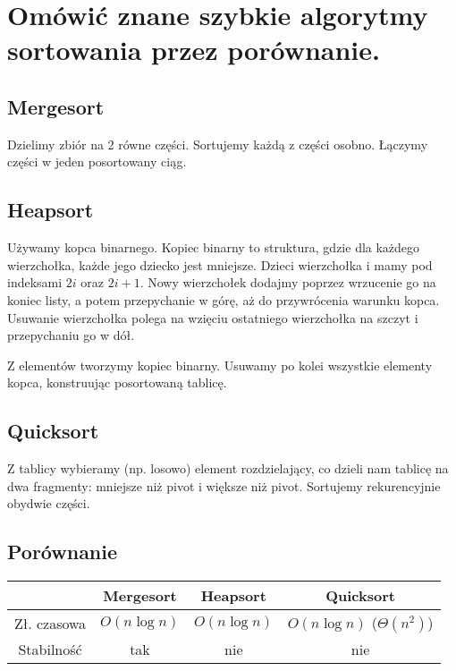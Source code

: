 \section{Omówić znane szybkie algorytmy sortowania przez porównanie.}

\subsection{Mergesort}
Dzielimy zbiór na 2 równe części.
Sortujemy każdą z części osobno.
Łączymy części w jeden posortowany ciąg.

\subsection{Heapsort}
Używamy kopca binarnego.
Kopiec binarny to struktura, gdzie dla każdego wierzchołka, każde jego dziecko jest mniejsze.
Dzieci wierzchołka i mamy pod indeksami $2i$ oraz $2i+1$.
Nowy wierzchołek dodajmy poprzez wrzucenie go na koniec listy, a potem przepychanie w górę,
aż do przywrócenia warunku kopca.
Usuwanie wierzchołka polega na wzięciu ostatniego wierzchołka na szczyt i przepychaniu go w dół.

Z elementów tworzymy kopiec binarny.
Usuwamy po kolei wszystkie elementy kopca, konstruując posortowaną tablicę.

\subsection{Quicksort}
Z tablicy wybieramy (np. losowo) element rozdzielający, co dzieli nam tablicę na dwa fragmenty:
mniejsze niż pivot i większe niż pivot.
Sortujemy rekurencyjnie obydwie części.

\subsection{Porównanie}
\begin{tabular}{|c|c|c|c|}
    \hline
    & Mergesort    & Heapsort     & Quicksort                     \\
    \hline
    Zł. czasowa & $O(n\log n)$ & $O(n\log n)$ & $O(n \log n)$ ($\Theta(n^2)$) \\
    Stabilność  & tak          & nie          & nie                           \\
    \hline
\end{tabular}
